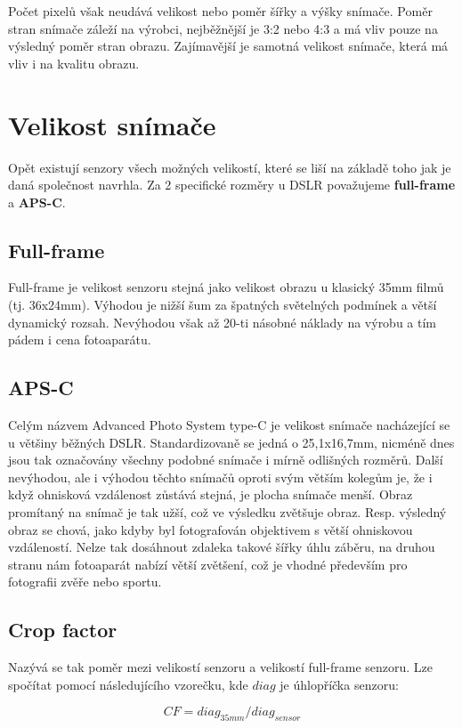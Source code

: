 \documentclass[12pt,a4paper,titlepage,final]{report}
\begin{document}
Počet pixelů však neudává velikost nebo poměr šířky a výšky snímače. Poměr stran snímače záleží na výrobci, nejběžnější je 3:2 nebo 4:3 a má vliv pouze na výsledný poměr stran obrazu. Zajímavější je samotná velikost snímače, která má vliv i na kvalitu obrazu. 

\section{Velikost snímače}
Opět existují senzory všech možných velikostí, které se liší na základě toho jak je daná společnost navrhla. Za 2 specifické rozměry u DSLR považujeme \textbf{full-frame} a \textbf{APS-C}.

\subsection{Full-frame}
Full-frame je velikost senzoru stejná jako velikost obrazu u klasický 35mm filmů (tj. 36x24mm). Výhodou je nižší šum za špatných světelných podmínek a větší dynamický rozsah. Nevýhodou však až 20-ti násobné náklady na výrobu a tím pádem i cena fotoaparátu.

\subsection{APS-C} Celým názvem Advanced Photo System type-C je velikost snímače nacházející se u většiny běžných DSLR. Standardizovaně se jedná o 25,1x16,7mm, nicméně dnes jsou tak označovány všechny podobné snímače i mírně odlišných rozměrů. Další nevýhodou, ale i výhodou těchto snímačů oproti svým větším kolegům je, že i když ohnisková vzdálenost zůstává stejná, je plocha snímače menší. Obraz promítaný na snímač je tak užší, což ve výsledku zvětšuje obraz. Resp. výsledný obraz se chová, jako kdyby byl fotografován objektivem s větší ohniskovou vzdáleností. Nelze tak dosáhnout zdaleka takové šířky úhlu záběru, na druhou stranu nám fotoaparát nabízí větší zvětšení, což je vhodné především pro fotografii zvěře nebo sportu.

\subsection{Crop factor}

Nazývá se tak poměr mezi velikostí senzoru a velikostí full-frame senzoru. Lze spočítat pomocí následujícího vzorečku, kde $diag$ je úhlopříčka senzoru:

$$CF = diag_{35mm} / diag_{sensor}$$
\end{document}

